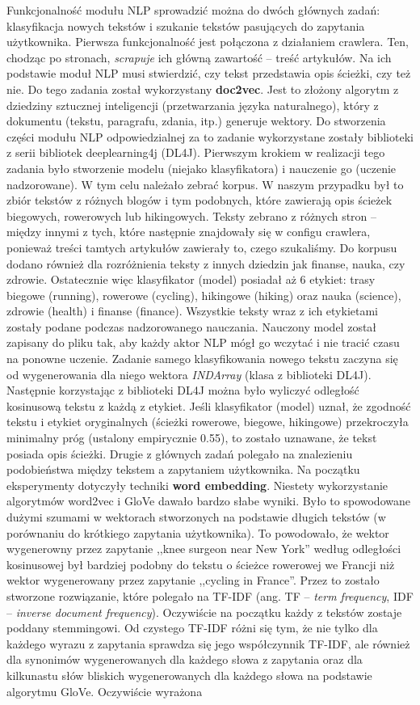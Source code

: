 \documentclass[titlepage]{article}
\begin{document}
Funkcjonalność modułu NLP sprowadzić można do dwóch głównych zadań: klasyfikacja nowych tekstów i szukanie tekstów pasujących do zapytania użytkownika. Pierwsza funkcjonalność jest połączona z działaniem crawlera. Ten, chodząc po stronach, \textit{scrapuje} ich główną zawartość -- treść artykułów. Na ich podstawie moduł NLP musi stwierdzić, czy tekst przedstawia opis ścieżki, czy też nie. Do tego zadania został wykorzystany \textbf{doc2vec}. Jest to złożony algorytm z dziedziny sztucznej inteligencji (przetwarzania języka naturalnego), który z dokumentu (tekstu, paragrafu, zdania, itp.) generuje wektory. Do stworzenia części modułu NLP odpowiedzialnej za to zadanie wykorzystane zostały biblioteki z serii bibliotek deeplearning4j (DL4J). Pierwszym krokiem w realizacji tego zadania było stworzenie modelu (niejako klasyfikatora) i nauczenie go (uczenie nadzorowane). W tym celu należało zebrać korpus. W naszym przypadku był to zbiór tekstów z różnych blogów i tym podobnych, które zawierają opis ścieżek biegowych, rowerowych lub hikingowych. Teksty zebrano z różnych stron -- między innymi z tych, które następnie znajdowały się w configu crawlera, ponieważ treści tamtych artykułów zawierały to, czego szukaliśmy. Do korpusu dodano również dla rozróżnienia teksty z innych dziedzin jak finanse, nauka, czy zdrowie. Ostatecznie więc klasyfikator (model) posiadał aż 6 etykiet: trasy biegowe (running), rowerowe (cycling), hikingowe (hiking) oraz nauka (science), zdrowie (health) i finanse (finance). Wszystkie teksty wraz z ich etykietami zostały podane podczas nadzorowanego nauczania. Nauczony model został zapisany do pliku tak, aby każdy aktor NLP mógł go wczytać i nie tracić czasu na ponowne uczenie. Zadanie samego klasyfikowania nowego tekstu zaczyna się od wygenerowania dla niego wektora \textit{INDArray} (klasa z biblioteki DL4J). Następnie korzystając z biblioteki DL4J można było wyliczyć odległość kosinusową tekstu z każdą z etykiet. Jeśli klasyfikator (model) uznał, że zgodność tekstu i etykiet oryginalnych (ścieżki rowerowe, biegowe, hikingowe) przekroczyła minimalny próg (ustalony empirycznie 0.55), to zostało uznawane, że tekst posiada opis ścieżki. Drugie z głównych zadań polegało na znalezieniu podobieństwa między tekstem a zapytaniem użytkownika. Na początku eksperymenty dotyczyły techniki \textbf{word embedding}. Niestety wykorzystanie algorytmów word2vec i GloVe dawało bardzo słabe wyniki. Było to spowodowane dużymi szumami w wektorach stworzonych na podstawie długich tekstów (w porównaniu do krótkiego zapytania użytkownika). To powodowało, że wektor wygenerowny przez zapytanie ,,knee surgeon near New York'' według odległości kosinusowej był bardziej podobny do tekstu o ścieżce rowerowej we Francji niż wektor wygenerowany przez zapytanie ,,cycling in France''. Przez to zostało stworzone rozwiązanie, które polegało na TF-IDF  (ang. TF – \textit{term frequency}, IDF – \textit{inverse document frequency}). Oczywiście na początku każdy z tekstów zostaje poddany stemmingowi. Od czystego TF-IDF różni się tym, że nie tylko dla każdego wyrazu z zapytania sprawdza się jego współczynnik TF-IDF, ale również dla synonimów wygenerowanych dla każdego słowa z zapytania oraz dla kilkunastu słów bliskich wygenerowanych dla każdego słowa na podstawie algorytmu GloVe. Oczywiście wyrażona 
\end{document}
